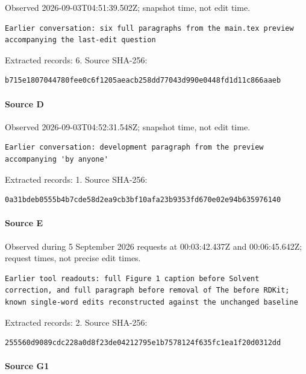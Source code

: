 \documentclass[11pt]{article}
\begin{document}
Observed 2026-09-03T04:51:39.502Z; snapshot time, not edit time.

\begin{lstlisting}
Earlier conversation: six full paragraphs from the main.tex preview accompanying the last-edit question
\end{lstlisting}

Extracted records: 6. Source SHA-256:

\begin{lstlisting}
b715e1807044780fee0c6f1205aeacb258dd77043d990e0448fd1d11c866aaeb
\end{lstlisting}

\paragraph{Source D}

Observed 2026-09-03T04:52:31.548Z; snapshot time, not edit time.

\begin{lstlisting}
Earlier conversation: development paragraph from the preview accompanying 'by anyone'
\end{lstlisting}

Extracted records: 1. Source SHA-256:

\begin{lstlisting}
0a31bdeb0555b4b7cde58d2ea9cb3bf10afa23b9353fd670e02e94b635976140
\end{lstlisting}

\paragraph{Source E}

Observed during 5 September 2026 requests at 00:03:42.437Z and 00:06:45.642Z; request times, not precise edit times.

\begin{lstlisting}
Earlier tool readouts: full Figure 1 caption before Solvent correction, and full paragraph before removal of The before RDKit; known single-word edits reconstructed against the unchanged baseline
\end{lstlisting}

Extracted records: 2. Source SHA-256:

\begin{lstlisting}
255560d9089cdc228a0d8f23de04212795e1b7578124f635fc1ea1f20d0312dd
\end{lstlisting}

\paragraph{Source G1}
\end{document}
